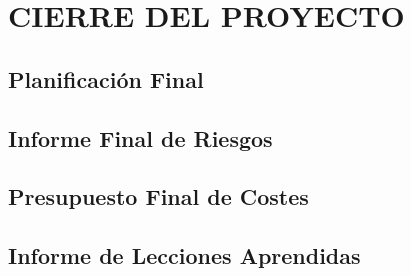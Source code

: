 \newpage
\section{CIERRE DEL PROYECTO}

\subsection{Planificación Final}

\subsection{Informe Final de Riesgos}

\subsection{Presupuesto Final de Costes}

\subsection{Informe de Lecciones Aprendidas}

